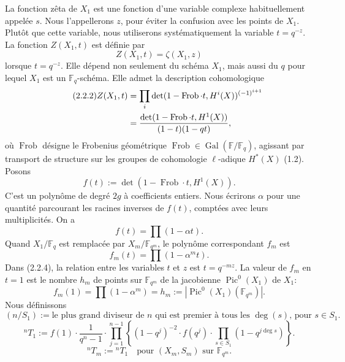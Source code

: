 \documentclass[10pt]{article}
\newcommand{\Fq}{\mathbb F_q}
\newcommand{\Fqm}{\mathbb F_{q^m}}
\newcommand{\Fb}{\mathbb F}
\newcommand{\Gal}{\operatorname{Gal}}
\newcommand{\Pic}{\operatorname{Pic}}
\newcommand{\Frob}{\operatorname{Frob}}
\newcommand{\degm}{\operatorname{deg}}
\theoremstyle{deligne}
\newcommand{\heading}[1]{\vspace{0.7em}\noindent{\bfseries #1}\quad}
\begin{document}
\heading{2.2.} La fonction zêta de $X_1$ est une fonction d'une variable complexe habituellement appelée $s$. Nous l'appellerons $z$, pour éviter la confusion avec les points de $X_1$. Plutôt que cette variable, nous utiliserons systématiquement la variable $t=q^{-z}$. La fonction $Z(X_1,t)$ est définie par
\begin{equation}\tag{2.2.1}
Z(X_1,t)=\zeta(X_1,z)
\end{equation}
lorsque $t=q^{-z}$. Elle dépend non seulement du schéma $X_1$, mais aussi du $q$ pour lequel $X_1$ est un $\Fq$-schéma. Elle admet la description cohomologique
\begin{align}\tag{2.2.2}
Z(X_1,t)&=\prod_i\det(1-\Frob\cdot t,H^i(X))^{(-1)^{i+1}}\\
&=\frac{\det(1-\Frob\cdot t,H^1(X))}{(1-t)(1-qt)},\notag
\end{align}
où $\Frob$ désigne le Frobenius géométrique $\Frob\in\Gal(\Fb/\Fq)$, agissant par transport de structure sur les groupes de cohomologie $\ell$-adique $H^*(X)$ (1.2). Posons
\[
f(t):=\det(1-\Frob\cdot t,H^1(X)).
\]
C'est un polynôme de degré $2g$ à coefficients entiers. Nous écrirons $\alpha$ pour une quantité parcourant les racines inverses de $f(t)$, comptées avec leurs multiplicités. On a
\begin{equation}\tag{2.2.3}
f(t)=\prod(1-\alpha t).
\end{equation}
Quand $X_1/\Fq$ est remplacée par $X_m/\Fqm$, le polynôme correspondant $f_m$ est
\begin{equation}\tag{2.2.4}
f_m(t)=\prod(1-\alpha^m t).
\end{equation}
Dans (2.2.4), la relation entre les variables $t$ et $z$ est $t=q^{-mz}$. La valeur de $f_m$ en $t=1$ est le nombre $h_m$ de points sur $\Fqm$ de la jacobienne $\Pic^0(X_1)$ de $X_1$:
\begin{equation}\tag{2.2.5}
f_m(1)=\prod(1-\alpha^m)=h_m:=|\Pic^0(X_1)(\Fqm)|.
\end{equation}
Nous définissons
\begin{equation}\tag{2.2.6}
(n/S_1):=\text{le plus grand diviseur de $n$ qui est premier à tous les $\degm(s)$, pour $s\in S_1$}.
\end{equation}
\begin{equation}\tag{2.2.7}
{}^nT_1:=f(1)\cdot\frac{1}{q^n-1}\cdot
\prod_{j=1}^{n-1}\left\{(1-q^j)^{-2}\cdot f(q^j)\cdot\prod_{s\in S_1}(1-q^{j\degm s})\right\}.
\end{equation}
\begin{equation}\tag{2.2.8}
{}^nT_m:={}^nT_1\quad\text{pour }(X_m,S_m)\text{ sur }\Fqm.
\end{equation}
\end{document}
